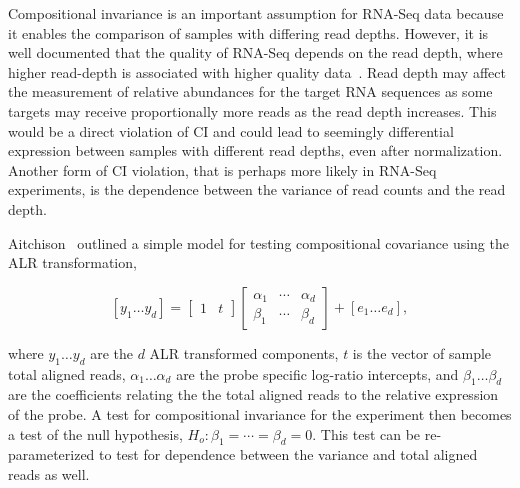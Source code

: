 Compositional invariance is an important assumption for RNA-Seq data because it enables the comparison of samples with differing read depths.  However, it is well documented that the quality of RNA-Seq depends on the read depth, where higher read-depth is associated with higher quality data~\cite{Tarazona2011,Sims2014}. Read depth may affect the measurement of relative abundances for the target RNA sequences as some targets may receive proportionally more reads as the read depth increases.  This would be a direct violation of CI and could lead to seemingly differential expression between samples with different read depths, even after normalization.  Another form of CI violation, that is perhaps more likely in RNA-Seq experiments, is the dependence between the variance of read counts and the read depth.


Aitchison~\cite{Aitchison1986} outlined a simple model for testing compositional covariance using the ALR transformation,  

\begin{equation}
\left[y_1 \ldots y_d \right] = 
\left[
\begin{array}{cc}
1 & t
\end{array}
\right]
\left[
\begin{array}{ccc}
\alpha_1 & \cdots & \alpha_d\\
\beta_1 & \cdots & \beta_d
\end{array}
\right] 
+
\left[e_1 \ldots e_d \right],
\label{matrixModel}
\end{equation}

where $y_1 \ldots y_d$ are the $d$ ALR transformed components, $t$ is the vector of sample total aligned reads, $\alpha_1 \ldots \alpha_d$ are the probe specific log-ratio intercepts, and $\beta_1 \ldots \beta_d$ are the coefficients relating the the total aligned reads to the relative expression of the probe.  A test for compositional invariance for the experiment then becomes a test of the null hypothesis, $H_o: \beta_1 = \cdots = \beta_d = 0$. This test can be re-parameterized to test for dependence between the variance and total aligned reads as well.



